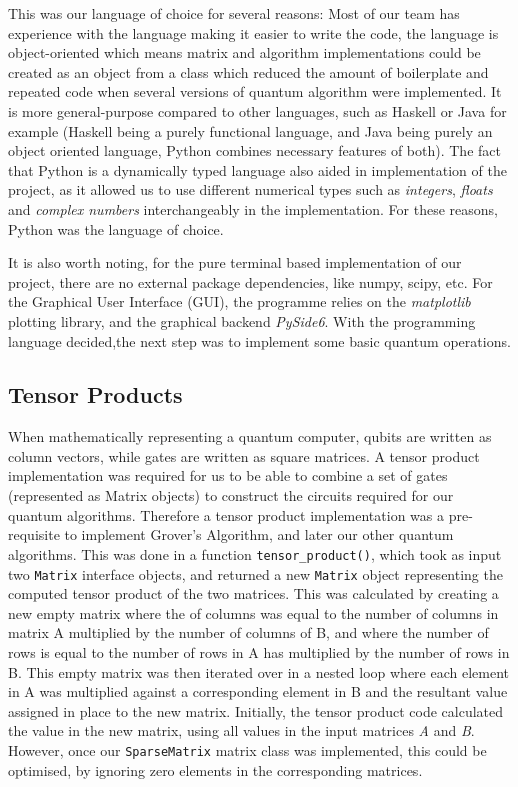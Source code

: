\documentclass{article}
\begin{document}
This was our language of choice for several reasons: Most of our team has experience with the language making it easier to write the code, the language is object-oriented which means matrix and algorithm implementations could be created as an object from a class which reduced the amount of boilerplate and repeated code when several versions of quantum algorithm were implemented.
It is more general-purpose compared to other languages, such as Haskell or Java for example (Haskell being a purely functional language, and Java being purely an object oriented language, Python combines necessary features of both). The fact that Python is a dynamically typed language also aided in implementation of the project, as it allowed us to use different numerical types such as \textit{integers}, \textit{floats} and \textit{complex numbers} interchangeably in the implementation.
For these reasons, Python was the language of choice.

\medskip

It is also worth noting, for the pure terminal based implementation of our project, there are no external package dependencies, like numpy, scipy, etc.
For the Graphical User Interface (GUI), the programme relies on the \textit{matplotlib} plotting library, and the graphical backend \textit{PySide6}\cite{noauthor_qt_nodate}.
With the programming language decided,the next step was to implement some basic quantum operations.

\subsection{\label{tensor-product}Tensor Products}

When mathematically representing a quantum computer, qubits are written as column vectors, while gates are written as square matrices.
A tensor product implementation was required for us to be able to combine a set of gates (represented as Matrix objects) to construct the circuits required for our quantum algorithms.
Therefore a tensor product implementation was a pre-requisite to implement Grover's Algorithm, and later our other quantum algorithms.
This was done in a function \verb#tensor_product()#, which took as input two \verb#Matrix# interface objects, and returned a new \verb#Matrix# object representing the computed tensor product of the two matrices.
This was calculated by creating a new empty matrix where the of columns was equal to the number of columns in matrix A multiplied by the number of columns of B, and where the number of rows is equal to the number of rows in A has multiplied by the number of rows in B.
This empty matrix was then iterated over in a nested loop where each element in A was multiplied against a corresponding element in B and the resultant value assigned in place to the new matrix.
Initially, the tensor product code calculated the value in the new matrix, using all values in the input matrices \textit{A} and \textit{B}.
However, once our \verb#SparseMatrix# matrix class was implemented, this could be optimised, by ignoring zero elements in the corresponding matrices.
\end{document}
